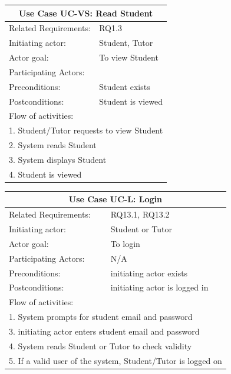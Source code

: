 \documentclass[12pt]{article}
\begin{document}
		\begin{tabular}{| l | p{10cm}| }
			\hline\multicolumn{2}{|c|}{ \textbf{Use Case UC-VS: Read Student}} \\ \hline
			Related Requirements: & RQ1.3 \\ \hline
			Initiating actor: & Student, Tutor\\ \hline
			Actor goal: & To view Student\\ \hline
			Participating Actors: & \\ \hline
			Preconditions: &Student exists\\ \hline
			Postconditions: & Student is viewed\\ \hline
			\multicolumn{2}{|l|}{Flow of activities:}\\ \hline
			\multicolumn{2}{|p{15cm}|}{1. Student/Tutor requests to view Student}\\
			\multicolumn{2}{|p{15cm}|}{2. System reads Student}\\
			\multicolumn{2}{|p{15cm}|}{3. System displays Student}\\
			\multicolumn{2}{|l|}{4. Student is viewed}
			\\ \hline
		\end{tabular}


		\begin{tabular}{| l | p{10cm}| }
			\hline\multicolumn{2}{|c|}{ \textbf{Use Case UC-L: Login}} \\ \hline
			Related Requirements: & RQ13.1, RQ13.2\\ \hline
			Initiating actor: & Student or Tutor \\ \hline
			Actor goal: & To login\\ \hline
			Participating Actors: &N/A\\ \hline
			Preconditions: &initiating actor exists\\ \hline
			Postconditions: & initiating actor is logged in\\ \hline
			\multicolumn{2}{|l|}{Flow of activities:}\\ \hline
			\multicolumn{2}{|p{15cm}|}{1. System prompts for student email and password}\\
			\multicolumn{2}{|p{15cm}|}{3. initiating actor enters student email and password}\\
			\multicolumn{2}{|l|}{4. System reads Student or Tutor to check validity}\\
			\multicolumn{2}{|l|}{5. If a valid user of the system, Student/Tutor is logged on}	\\
			 \hline
		\end{tabular}
\end{document}
